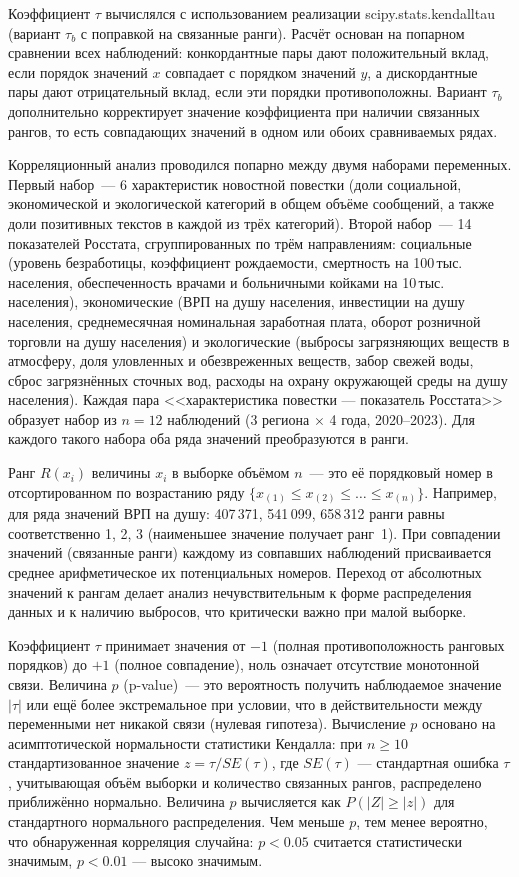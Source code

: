 \documentclass[master, och, coursework]{SCWorks1}
\begin{document}
Коэффициент $\tau$ вычислялся с использованием реализации scipy.stats.kendalltau (вариант $\tau_b$ с поправкой на связанные ранги). Расчёт основан на попарном сравнении всех наблюдений: конкордантные пары дают положительный вклад, если порядок значений $x$ совпадает с порядком значений $y$, а дискордантные пары дают отрицательный вклад, если эти порядки противоположны. Вариант $\tau_b$ дополнительно корректирует значение коэффициента при наличии связанных рангов, то есть совпадающих значений в одном или обоих сравниваемых рядах.

Корреляционный анализ проводился попарно между двумя наборами переменных. Первый набор~--- 6 характеристик новостной повестки (доли социальной, экономической и экологической категорий в общем объёме сообщений, а также доли позитивных текстов в каждой из трёх категорий). Второй набор~--- 14 показателей Росстата, сгруппированных по трём направлениям: социальные (уровень безработицы, коэффициент рождаемости, смертность на 100\,тыс. населения, обеспеченность врачами и больничными койками на 10\,тыс. населения), экономические (ВРП на душу населения, инвестиции на душу населения, среднемесячная номинальная заработная плата, оборот розничной торговли на душу населения) и экологические (выбросы загрязняющих веществ в атмосферу, доля уловленных и обезвреженных веществ, забор свежей воды, сброс загрязнённых сточных вод, расходы на охрану окружающей среды на душу населения). Каждая пара <<характеристика повестки --- показатель Росстата>> образует набор из $n=12$ наблюдений (3 региона $\times$ 4 года, 2020--2023). Для каждого такого набора оба ряда значений преобразуются в ранги.

Ранг $R(x_i)$ величины $x_i$ в выборке объёмом $n$~--- это её порядковый номер в отсортированном по возрастанию ряду $\{x_{(1)} \le x_{(2)} \le \ldots \le x_{(n)}\}$. Например, для ряда значений ВРП на душу: 407\,371, 541\,099, 658\,312 ранги равны соответственно 1, 2, 3 (наименьшее значение получает ранг~1). При совпадении значений (связанные ранги) каждому из совпавших наблюдений присваивается среднее арифметическое их потенциальных номеров. Переход от абсолютных значений к рангам делает анализ нечувствительным к форме распределения данных и к наличию выбросов, что критически важно при малой выборке.

Коэффициент $\tau$ принимает значения от $-1$ (полная противоположность ранговых порядков) до $+1$ (полное совпадение), ноль означает отсутствие монотонной связи. Величина $p$ (p-value)~--- это вероятность получить наблюдаемое значение $|\tau|$ или ещё более экстремальное при условии, что в действительности между переменными нет никакой связи (нулевая гипотеза). Вычисление $p$ основано на асимптотической нормальности статистики Кендалла: при $n \ge 10$ стандартизованное значение $z = \tau / SE(\tau)$, где $SE(\tau)$ — стандартная ошибка $\tau$, учитывающая объём выборки и количество связанных рангов, распределено приближённо нормально. Величина $p$ вычисляется как $P(|Z| \ge |z|)$ для стандартного нормального распределения. Чем меньше $p$, тем менее вероятно, что обнаруженная корреляция случайна: $p < 0.05$ считается статистически значимым, $p < 0.01$ --- высоко значимым.
\end{document}
